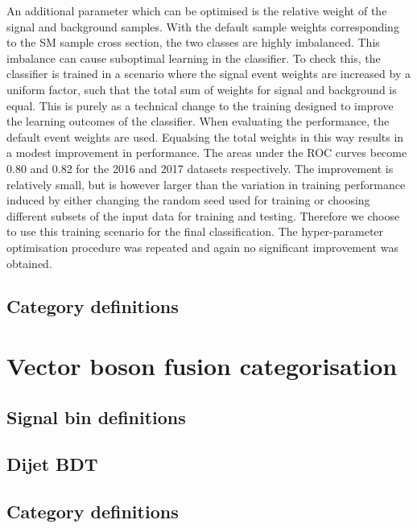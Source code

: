 An additional parameter which can be optimised is the relative weight 
of the signal and background samples.
With the default sample weights corresponding to the SM sample cross section, 
the two classes are highly imbalanced.
This imbalance can cause suboptimal learning in the classifier.
To check this, the classifier is trained in a scenario 
where the signal event weights are increased by a uniform factor, 
such that the total sum of weights for signal and background is equal.
This is purely as a technical change to the training 
designed to improve the learning outcomes of the classifier.
When evaluating the performance, the default event weights are used.
Equalsing the total weights in this way results in a modest improvement in performance.
The areas under the ROC curves become 0.80 and 0.82 for the 2016 and 2017 datasets respectively.
The improvement is relatively small, 
but is however larger than the variation 
in training performance induced by either changing the random seed used for training or 
choosing different subsets of the input data for training and testing.
Therefore we choose to use this training scenario for the final classification.
The hyper-parameter optimisation procedure was repeated 
and again no significant improvement was obtained.


\subsection{Category definitions}

\section{Vector boson fusion categorisation}
\subsection{Signal bin definitions}
\subsection{Dijet BDT}
\subsection{Category definitions}

